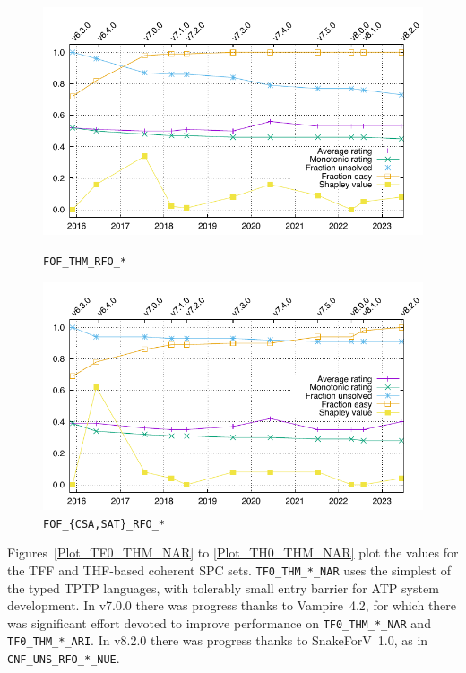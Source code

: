 \documentclass[runningheads]{llncs}
\begin{document}
\begin{figure}[h!]
\centering
\begin{minipage}[t]{.49\textwidth}
  \centering
  \includegraphics[width=\textwidth]{Plots/GNUPlots/FOF_THM_RFO.pdf}
  \vspace*{-2em}
  \caption{{\tt FOF\_THM\_RFO\_*}}
  \label{Plot_FOF_THM_RFO}
\end{minipage}
\begin{minipage}[t]{.49\textwidth}
  \centering
  \includegraphics[width=\textwidth]{Plots/GNUPlots/FOF_CSA_SAT_RFO.pdf}
  \vspace*{-2em}
  \caption{{\tt FOF\_\{CSA,SAT\}\_RFO\_*}}
  \label{Plot_FOF_CSA_SAT_RFO}
\end{minipage}
\end{figure}

Figures~\ref{Plot_TF0_THM_NAR} to \ref{Plot_TH0_THM_NAR} plot the values for the TFF and
THF-based coherent SPC sets.
{\tt TF0\_THM\_*\_NAR} uses the simplest of the typed TPTP languages, with tolerably small
entry barrier for ATP system development.
In v7.0.0 there was progress thanks to Vampire~4.2, for which there was significant effort
devoted to improve performance on {\tt TF0\_THM\_*\_NAR} and {\tt TF0\_THM\_*\_ARI}.
In v8.2.0 there was progress thanks to SnakeForV~1.0, as in {\tt CNF\_UNS\_RFO\_*\_NUE}.
\end{document}
